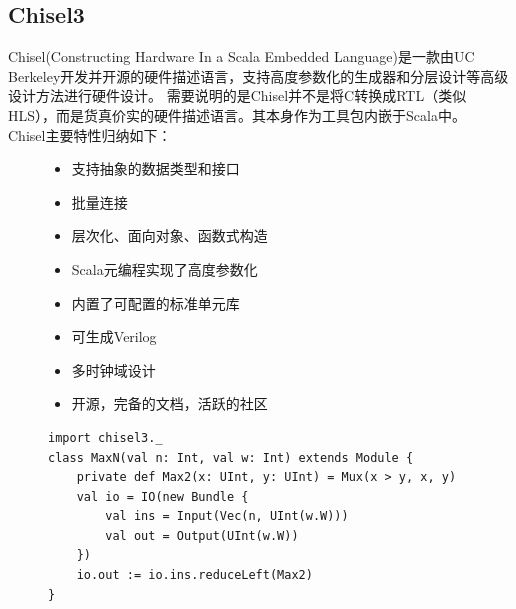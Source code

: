     \subsection{Chisel3}
        Chisel(Constructing Hardware In a Scala Embedded Language)是一款由UC Berkeley开发并开源的硬件描述语言，支持高度参数化的生成器和分层设计等高级设计方法进行硬件设计。
        需要说明的是Chisel并不是将C转换成RTL（类似HLS），而是货真价实的硬件描述语言。其本身作为工具包内嵌于Scala中。 \\
        Chisel主要特性归纳如下：
        \begin{figure}[h]
            \begin{itemize}[topsep = 0 pt]
                \setlength{\topsep}{0pt}
                \setlength{\itemsep}{0pt}
                \setlength{\parsep}{0pt}
                \setlength{\parskip}{0pt}
                \setlength{\partopsep}{0pt}
                \item 支持抽象的数据类型和接口
                \item 批量连接
                \item 层次化、面向对象、函数式构造
                \item Scala元编程实现了高度参数化
                \item 内置了可配置的标准单元库
                \item 可生成Verilog
                \item 多时钟域设计
                \item 开源，完备的文档，活跃的社区
            \end{itemize}
        \end{figure}
        \begin{figure}[h]
            \label{chisel_example}
            \begin{lstlisting}[title=Chisel Example, frame=shadowbox]
import chisel3._
class MaxN(val n: Int, val w: Int) extends Module {
    private def Max2(x: UInt, y: UInt) = Mux(x > y, x, y)
    val io = IO(new Bundle {
        val ins = Input(Vec(n, UInt(w.W)))
        val out = Output(UInt(w.W))
    })
    io.out := io.ins.reduceLeft(Max2)
}
            \end{lstlisting}
        \end{figure}

